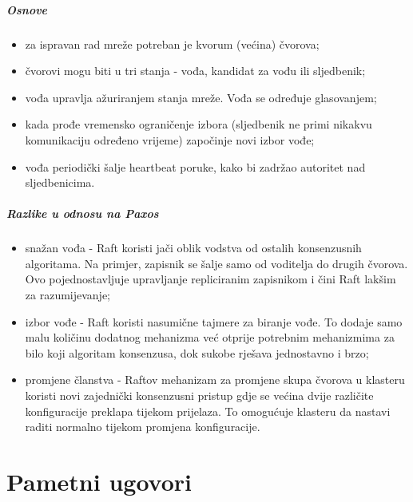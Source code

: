 \documentclass[times, utf8, diplomski]{fer}
\begin{document}
\subparagraph{Osnove}

\begin{itemize}

\item za ispravan rad mreže potreban je kvorum (većina) čvorova;

\item čvorovi mogu biti u tri stanja - vođa, kandidat za vođu ili sljedbenik;

\item vođa upravlja ažuriranjem stanja mreže. Vođa se određuje glasovanjem;

\item kada prođe vremensko ograničenje izbora (sljedbenik ne primi nikakvu komunikaciju određeno vrijeme) započinje novi izbor vođe;

\item vođa periodički šalje heartbeat poruke, kako bi zadržao autoritet nad sljedbenicima.

\end{itemize}

\subparagraph{Razlike u odnosu na Paxos}

\begin{itemize}

\item snažan vođa - Raft koristi jači oblik vodstva od ostalih konsenzusnih algoritama. Na primjer, zapisnik se šalje samo od voditelja do drugih čvorova. Ovo pojednostavljuje upravljanje repliciranim zapisnikom i čini Raft lakšim za razumijevanje;

\item izbor vođe - Raft koristi nasumične tajmere za biranje vođe. To dodaje samo malu količinu dodatnog mehanizma već otprije potrebnim mehanizmima za bilo koji algoritam konsenzusa, dok sukobe rješava jednostavno i brzo;

\item promjene članstva - Raftov mehanizam za promjene skupa čvorova u klasteru koristi novi zajednički konsenzusni pristup gdje se većina dvije različite konfiguracije preklapa tijekom prijelaza. To omogućuje klasteru da nastavi raditi normalno tijekom promjena konfiguracije.

\end{itemize}

\section{Pametni ugovori}
\end{document}
